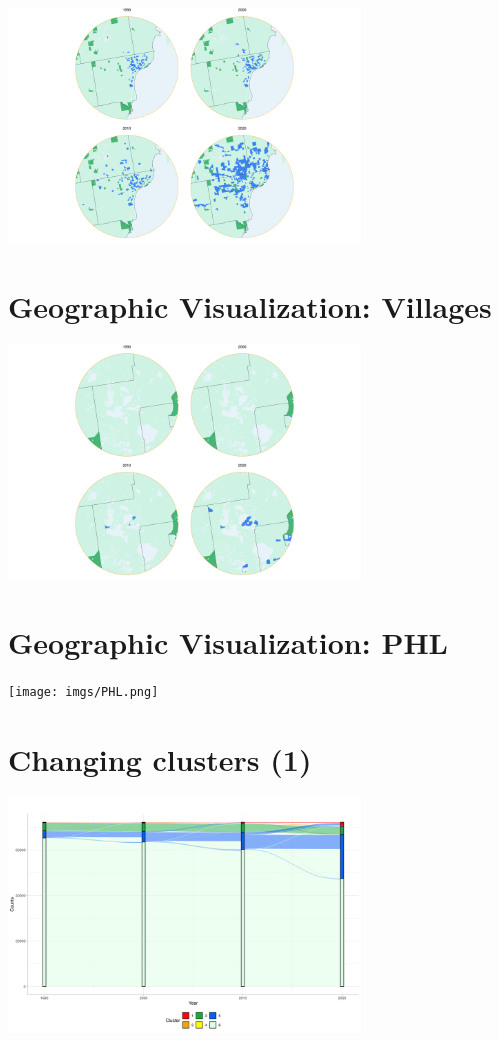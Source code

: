 \documentclass[
  letterpaper,
  DIV=11,
  numbers=noendperiod]{scrartcl}
\begin{document}
\includegraphics[width=0.7\textwidth,height=\textheight]{imgs/DTW.png}

\hypertarget{geographic-visualization-villages}{%
\section{Geographic Visualization:
Villages}\label{geographic-visualization-villages}}

\includegraphics[width=0.7\textwidth,height=\textheight]{imgs/VIL.png}

\hypertarget{geographic-visualization-phl}{%
\section{Geographic Visualization:
PHL}\label{geographic-visualization-phl}}

\texttt{[image: imgs/PHL.png]}

\hypertarget{changing-clusters-1}{%
\section{Changing clusters (1)}\label{changing-clusters-1}}

\includegraphics[width=0.7\textwidth,height=\textheight]{imgs/sankey.png}
\end{document}
